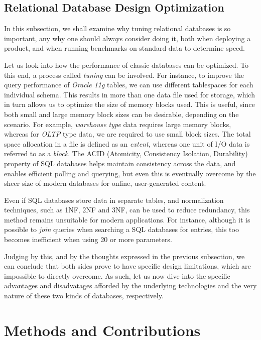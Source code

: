\documentclass[10pt,        %
               a4paper,     %
               journal,     %
               ]{IEEEtran}
\begin{document}
\subsection{Relational Database Design Optimization}
In this subsection, we shall examine why tuning relational databases is so important, any why one should always consider doing it, both when deploying a product, and when running benchmarks on standard data to determine speed. \par
Let us look into how the performance of classic databases can be optimized. To this end, a process called \textit{tuning} can be involved. For instance, to improve the query performance of \textit{Oracle 11g} tables, we can use different tablespaces for each individual schema.  This results in more than one data file used for storage, which in turn allows us to optimize the size of memory blocks used. This is useful, since both small and large memory block sizes can be desirable, depending on the scenario. For example, \textit{warehouse type} data requires large memory blocks, whereas for \textit{OLTP} type data, we are required to use small block sizes. The total space allocation in a file is defined as an \textit{extent}, whereas one unit of I/O data is referred to as a \textit{block}. 
The ACID (Atomicity, Consistency Isolation, Durability) property of SQL databases helps maintain consistency across the data, and enables efficient polling and querying, but even this is eventually overcome by the sheer size of modern databases for online, user-generated content. \par
Even if SQL databases store data in separate tables, and normalization techniques, such as 1NF, 2NF and 3NF, can be used to reduce redundancy, this method remains unsuitable for modern applications. For instance, although it is possible to \textit{join} queries when searching a SQL databases for entries, this too becomes inefficient when using 20 or more parameters. \par
Judging by this, and by the thoughts expressed in the previous subsection, we can conclude that both sides prove to have specific design limitations, which are impossible to directly overcome. As such, let us now dive into the specific advantages and disadvatages afforded by the underlying technologies and the very nature of these two kinds of databases, respectively. 

\section{Methods and Contributions}
\end{document}
